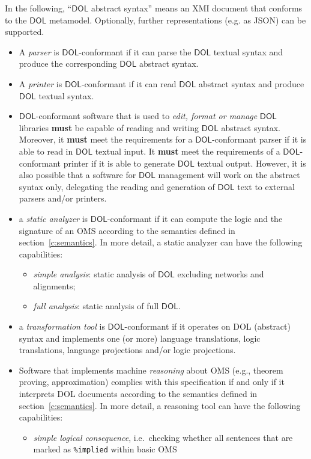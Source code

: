 \documentclass[10pt, a4paper]{isov2}
\newcommand*{\syntax}[1]{\texttt{#1}}
\newcommand*{\hasto}{\textbf{must}\xspace}
\newcommand*{\DOL}{\ensuremath{\mathsf{DOL}}\xspace}
\begin{document}
In the following, ``\DOL abstract syntax'' means an XMI document that
conforms to the \DOL metamodel. Optionally, further representations
(e.g. as JSON) can be supported.
\begin{itemize}
\item
A \emph{parser} is \DOL-conformant if it can parse the \DOL textual syntax and produce the corresponding \DOL abstract syntax.
\item
A \emph{printer} is \DOL-conformant if it can read \DOL abstract syntax and produce \DOL textual syntax.
\item
{\DOL}-conformant software that is used to \emph{edit, format or manage} \DOL libraries \hasto be capable of reading and writing \DOL abstract syntax. Moreover, it \hasto meet the requirements for a \DOL-conformant parser if it is able to read in \DOL textual input. It \hasto meet the requirements of a \DOL-conformant printer if it is able to generate \DOL textual output. However, it is also possible that a software for \DOL management will work on the abstract syntax only, delegating the reading and generation of \DOL text to external parsers and/or printers.
\item a \emph{static analyzer} is \DOL-conformant if it can compute
  the logic and the signature of an OMS according to the semantics
  defined in section~\ref{c:semantics}. In more detail, a static analyzer
  can have the following capabilities:
\begin{itemize}
\item \emph{simple analysis}: static analysis of \DOL excluding networks and alignments;
\item \emph{full analysis}: static analysis of full \DOL.
\end{itemize}
\item a \emph{transformation tool} is \DOL-conformant if it operates on DOL (abstract) syntax and implements
one (or more) language translations, logic translations, language
projections and/or logic projections.
\item
Software that implements machine \emph{reasoning} about OMS (e.g., theorem proving, approximation)  complies with this specification if and only if it interprets  DOL documents according to the semantics defined in section~\ref{c:semantics}. In more detail, a reasoning tool can have the following capabilities:
\begin{itemize}
\item \emph{simple logical consequence}, i.e.\ checking whether all sentences that are marked as \syntax{\%implied} within basic OMS

\end{itemize}
\end{itemize}
\end{document}
